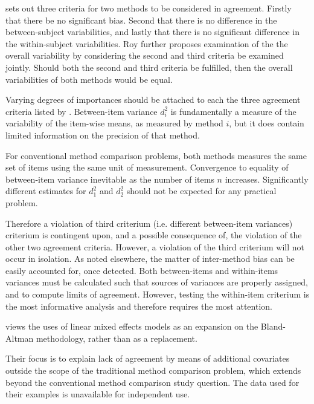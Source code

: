 \documentclass[12pt, a4paper]{report}
\theoremstyle{plain}
\theoremstyle{definition}
\theoremstyle{remark}
\begin{document}
			
			\citet{Barnhart} sets out three criteria for two methods to be considered in agreement. Firstly that there be no significant bias. Second that there is no difference in the between-subject variabilities, and lastly that there is no significant difference in the within-subject variabilities. Roy further proposes examination of the the overall variability by considering the second and third criteria be examined jointly. Should both the second and third criteria be fulfilled, then the overall variabilities of both methods would be equal.
			
			Varying degrees of importances should be attached to each the three agreement criteria listed by \citet{Barnhart}. Between-item variance $d^2_i$ is fundamentally a measure of the variability of the item-wise means, as measured by method $i$, but it does contain limited information on the precision of that method. 
			
			For conventional method comparison problems, both methods measures the same set of items using the same unit of measurement. Convergence to equality of between-item variance inevitable as the number of items $n$ increases. Significantly different estimates for $d^2_1$ and $d^2_2$ should not be expected for any practical problem. 
			
			Therefore a violation of third criterium (i.e. different between-item variances) criterium is contingent upon, and a  
			possible consequence of, the violation of the other two agreement criteria. However, a violation of the third criterium will not occur in isolation. As noted elsewhere, the matter of inter-method bias can be easily accounted for, once detected. Both between-items and within-items variances must be calculated such that sources of variances are properly assigned, and to compute limits of agreement. However, testing the within-item criterium is the most informative analysis and therefore requires the most attention. 
			
			
			
			
			\citet{LaiShiao} views
			the uses of linear mixed effects models as an expansion on the
			Bland-Altman methodology, rather than as a replacement. 
			
			Their focus is to explain lack of agreement by means of additional covariates outside the scope of the traditional method comparison problem, which extends beyond the conventional method comparison study question. The data used for their examples is unavailable for independent use. 
			
\end{document}
